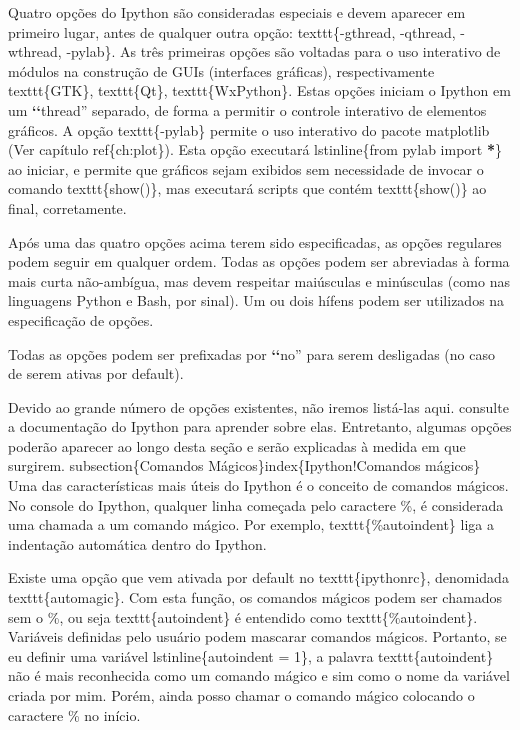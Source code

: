 \documentclass[a4paper,10pt,portuguese]{sphinxmanual}
\begin{document}
Quatro opções do Ipython são consideradas especiais e devem aparecer em primeiro lugar, antes de qualquer outra opção: texttt\{-gthread, -qthread, -wthread, -pylab\}. As três primeiras opções são voltadas para o uso interativo de módulos na construção de GUIs (interfaces gráficas), respectivamente texttt\{GTK\}, texttt\{Qt\}, texttt\{WxPython\}. Estas opções iniciam o Ipython em um {\color{red}\bfseries{}{}`{}`}thread'' separado, de forma a permitir o controle interativo de elementos gráficos. A opção texttt\{-pylab\} permite o uso interativo do pacote matplotlib (Ver capítulo ref\{ch:plot\}). Esta opção executará lstinline\{from pylab import {\color{red}\bfseries{}*}\} ao iniciar, e permite que gráficos sejam exibidos sem necessidade de invocar o comando texttt\{show()\}, mas executará scripts que contém texttt\{show()\} ao final, corretamente.

Após uma das quatro opções acima terem sido especificadas, as opções regulares podem seguir em qualquer ordem. Todas as opções podem ser abreviadas à forma mais curta não-ambígua, mas devem respeitar maiúsculas e minúsculas (como nas linguagens Python e Bash, por sinal). Um ou dois hífens podem ser utilizados na especificação de opções.

Todas as opções podem ser prefixadas por {\color{red}\bfseries{}{}`{}`}no'' para serem desligadas (no caso de serem ativas por default).

Devido ao grande número de opções existentes, não iremos listá-las aqui. consulte a documentação do Ipython para aprender sobre elas. Entretanto, algumas opções poderão aparecer ao longo desta seção e serão explicadas à medida em que surgirem.
subsection\{Comandos Mágicos\}index\{Ipython!Comandos mágicos\}
Uma das características mais úteis do Ipython é o conceito de comandos mágicos. No console do Ipython, qualquer linha começada pelo caractere \%, é considerada uma chamada a um comando mágico. Por exemplo, texttt\{\%autoindent\} liga a indentação automática dentro do Ipython.

Existe uma opção que vem ativada por default no texttt\{ipythonrc\}, denomidada texttt\{automagic\}. Com esta função, os comandos mágicos podem ser chamados sem o \%, ou seja texttt\{autoindent\} é entendido como texttt\{\%autoindent\}. Variáveis definidas pelo usuário podem mascarar comandos mágicos. Portanto, se eu definir uma variável lstinline\{autoindent = 1\}, a palavra texttt\{autoindent\} não é mais reconhecida como um comando mágico e sim como o nome da variável criada por mim. Porém, ainda posso chamar o comando mágico colocando o caractere \% no início.
\end{document}
